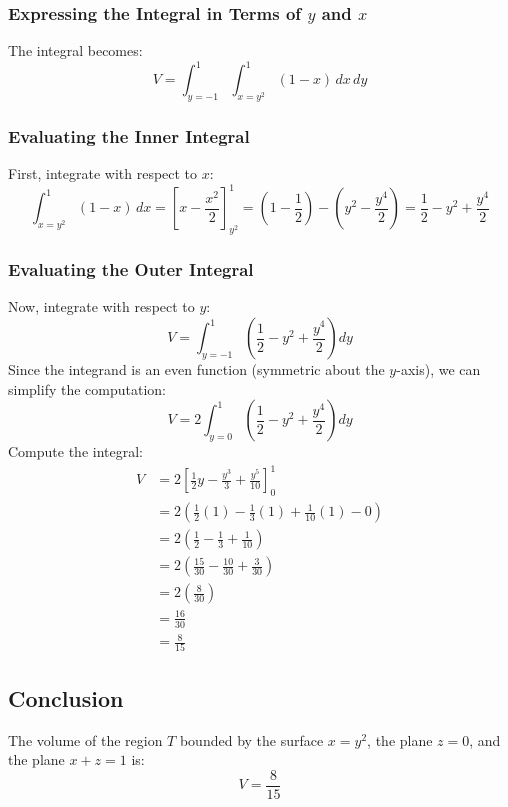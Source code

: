 \documentclass[11pt]{article}
\begin{document}
\subsubsection{Expressing the Integral in Terms of \( y \) and \( x \)}

The integral becomes:
\[
V = \int_{y=-1}^{1} \int_{x=y^2}^{1} (1 - x) \, dx \, dy
\]

\subsubsection{Evaluating the Inner Integral}

First, integrate with respect to \( x \):
\[
\int_{x=y^2}^{1} (1 - x) \, dx = \left[ x - \frac{x^2}{2} \right]_{y^2}^{1} = \left( 1 - \frac{1}{2} \right) - \left( y^2 - \frac{y^4}{2} \right) = \frac{1}{2} - y^2 + \frac{y^4}{2}
\]

\subsubsection{Evaluating the Outer Integral}

Now, integrate with respect to \( y \):
\[
V = \int_{y=-1}^{1} \left( \frac{1}{2} - y^2 + \frac{y^4}{2} \right) dy
\]
Since the integrand is an even function (symmetric about the \( y \)-axis), we can simplify the computation:
\[
V = 2 \int_{y=0}^{1} \left( \frac{1}{2} - y^2 + \frac{y^4}{2} \right) dy
\]
Compute the integral:
\[
\begin{aligned}
V &= 2 \left[ \frac{1}{2} y - \frac{y^3}{3} + \frac{y^5}{10} \right]_{0}^{1} \\
&= 2 \left( \frac{1}{2} (1) - \frac{1}{3} (1) + \frac{1}{10} (1) - 0 \right) \\
&= 2 \left( \frac{1}{2} - \frac{1}{3} + \frac{1}{10} \right) \\
&= 2 \left( \frac{15}{30} - \frac{10}{30} + \frac{3}{30} \right) \\
&= 2 \left( \frac{8}{30} \right) \\
&= \frac{16}{30} \\
&= \frac{8}{15}
\end{aligned}
\]

\subsection{Conclusion}

The volume of the region \( T \) bounded by the surface \( x = y^2 \), the plane \( z = 0 \), and the plane \( x + z = 1 \) is:
\[
V = \frac{8}{15}
\]
\end{document}
